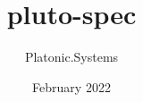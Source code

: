 \documentclass{article}
\title{pluto-spec}
\author{Platonic.Systems}
\date{February 2022}
\begin{document}
\maketitle{}

\nocite{*}




\printbibliography
\end{document}
